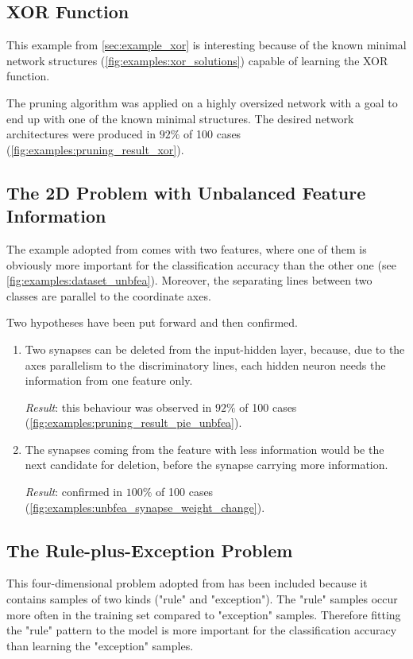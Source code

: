 \subsection*{XOR Function}
This example from \cref{sec:example_xor} is interesting because of the known minimal network structures (\cref{fig:examples:xor_solutions}) capable of learning the XOR function. 

The pruning algorithm was applied on a highly oversized network with a goal to end up with one of the known minimal structures. The desired network architectures were produced in $ 92\% $ of 100 cases (\cref{fig:examples:pruning_result_xor}).

\subsection*{The 2D Problem with Unbalanced Feature Information}
The example adopted from \citep{karnin:pa} comes with two features, where one of them is obviously more important for the classification accuracy than the other one (see \cref{fig:examples:dataset_unbfea}). Moreover, the separating lines between two classes are parallel to the coordinate axes.

Two hypotheses have been put forward and then confirmed.

\begin{enumerate}
\item Two synapses can be deleted from the input-hidden layer, because, due to the axes parallelism to the discriminatory lines, each hidden neuron needs the information from one feature only. 

\textit{Result}: this behaviour was observed in $ 92\% $ of 100 cases (\cref{fig:examples:pruning_result_pie_unbfea}).

\item  The synapses coming from the feature with less information would be the next candidate for deletion, before the synapse carrying more information.

\textit{Result}: confirmed in $ 100\% $ of 100 cases (\cref{fig:examples:unbfea_synapse_weight_change}).
\end{enumerate}

\subsection*{The Rule-plus-Exception Problem}
This four-dimensional problem adopted from \citep{mozer:skeletonization} has been included because it contains samples of two kinds ("rule" and "exception"). The "rule" samples occur more often in the training set compared to "exception" samples. Therefore fitting the "rule" pattern to the model is more important for the classification accuracy than learning the "exception" samples.

